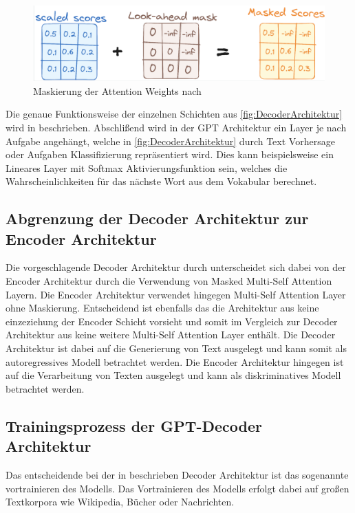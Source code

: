 \documentclass[conference]{IEEEtran}
\begin{document}
\begin{figure}[htbp]
    \centerline{\includegraphics[width=\linewidth]{Bilder/MaskierungAttentionWeights.png}}
    \caption{Maskierung der Attention Weights nach \cite{}}
\label{fig:Maskierung}
\end{figure}
Die genaue Funktionsweise der einzelnen Schichten aus \autoref{fig:DecoderArchitektur}  wird in \cite{vaswaniAttentionAllYou2023} beschrieben. Abschlißend wird in der GPT Architektur ein Layer je nach Aufgabe angehängt, welche in \autoref{fig:DecoderArchitektur} durch Text Vorhersage oder Aufgaben Klassifizierung repräsentiert wird. Dies kann beispielsweise ein Lineares Layer mit Softmax Aktivierungsfunktion sein, welches die Wahrscheinlichkeiten für das nächste Wort aus dem Vokabular berechnet.
\subsection{Abgrenzung der Decoder Architektur zur Encoder Architektur}
Die vorgeschlagende Decoder Architektur durch \cite{radfordImprovingLanguageUnderstanding} unterscheidet sich dabei von der Encoder Architektur durch die Verwendung von Masked Multi-Self Attention Layern. Die Encoder Architektur verwendet hingegen Multi-Self Attention Layer ohne Maskierung. Entscheidend ist ebenfalls das die Architektur aus \cite{radfordImprovingLanguageUnderstanding} keine einzeziehung der Encoder Schicht vorsieht und somit im Vergleich zur Decoder Architektur aus \cite{vaswaniAttentionAllYou2023} keine weitere Multi-Self Attention Layer enthält. Die Decoder Architektur ist dabei auf die Generierung von Text ausgelegt und kann somit als autoregressives Modell betrachtet werden. Die Encoder Architektur hingegen ist auf die Verarbeitung von Texten ausgelegt und kann als diskriminatives Modell betrachtet werden.
\subsection{Trainingsprozess der GPT-Decoder Architektur}
Das entscheidende bei der in \cite{radfordImprovingLanguageUnderstanding} beschrieben Decoder Architektur ist das sogenannte vortrainieren des Modells. Das Vortrainieren des Modells erfolgt dabei auf großen Textkorpora wie Wikipedia, Bücher oder Nachrichten.
\end{document}
